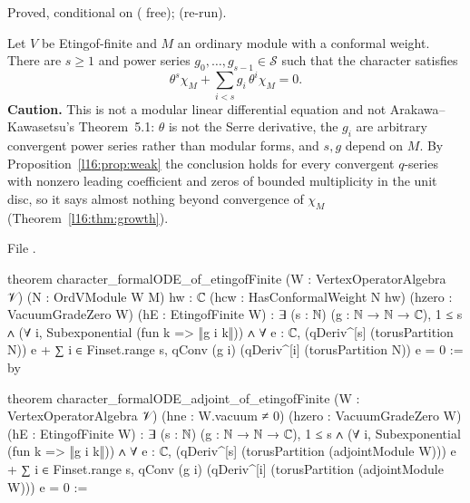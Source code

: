 \begin{status}
Proved, conditional on  ( free); \lean{[propext, Classical.}\allowbreak{}\allowbreak\lean{sound]} (re-run).
\end{status}

\begin{theorem}\label{l16:thm:formalODE}
Let $V$ be Etingof-finite and $M$ an ordinary module with a conformal weight. There are $s\ge1$ and power series
$g_0,\dots,g_{s-1}\in\mathcal S$ such that the character satisfies
\begin{equation}\label{l16:eq:formalODE}
\theta^s\chi_M + \sum_{i<s}g_i\,\theta^i\chi_M = 0 .
\end{equation}
\textbf{Caution.} This is not a modular linear differential equation and not Arakawa--Kawasetsu's
Theorem~5.1: $\theta$ is not the Serre derivative, the $g_i$ are arbitrary convergent power series rather than
modular forms, and $s,g$ depend on $M$. By Proposition~\ref{l16:prop:weak} the conclusion holds for every
convergent $q$-series with nonzero leading coefficient and zeros of bounded multiplicity in the unit disc, so it
says almost nothing beyond convergence of $\chi_M$ (Theorem~\ref{l16:thm:growth}).
\end{theorem}
\noindent File .
\begin{leancode}
theorem character_formalODE_of_etingofFinite (W : VertexOperatorAlgebra 𝒱) (N : OrdVModule W M)
    {hw : ℂ} (hcw : HasConformalWeight N hw) (hzero : VacuumGradeZero W) (hE : EtingofFinite W) :
    ∃ (s : ℕ) (g : ℕ → ℕ → ℂ), 1 ≤ s ∧ (∀ i, Subexponential (fun k => ‖g i k‖)) ∧
      ∀ e : ℂ, (qDeriv^[s] (torusPartition N)) e
        + ∑ i ∈ Finset.range s, qConv (g i) (qDeriv^[i] (torusPartition N)) e = 0 := by

theorem character_formalODE_adjoint_of_etingofFinite (W : VertexOperatorAlgebra 𝒱)
    (hne : W.vacuum ≠ 0) (hzero : VacuumGradeZero W) (hE : EtingofFinite W) :
    ∃ (s : ℕ) (g : ℕ → ℕ → ℂ), 1 ≤ s ∧ (∀ i, Subexponential (fun k => ‖g i k‖)) ∧
      ∀ e : ℂ, (qDeriv^[s] (torusPartition (adjointModule W))) e
        + ∑ i ∈ Finset.range s,
            qConv (g i) (qDeriv^[i] (torusPartition (adjointModule W))) e = 0 :=
\end{leancode}

